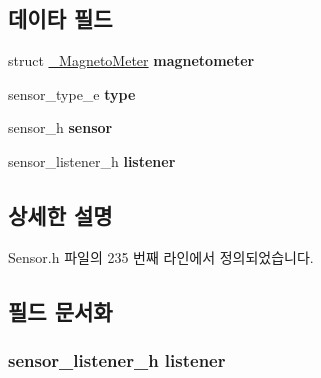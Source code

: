 \subsection*{데이타 필드}
\begin{DoxyCompactItemize}
\item 
\hypertarget{struct___magneto_meter_extend_a8679591114ee0c09969a82b9bd9f9fe4}{struct \hyperlink{struct___magneto_meter}{\-\_\-\-Magneto\-Meter} {\bfseries magnetometer}}\label{struct___magneto_meter_extend_a8679591114ee0c09969a82b9bd9f9fe4}

\item 
\hypertarget{struct___magneto_meter_extend_abffb09766da2fc510a79bb51f82a36e1}{sensor\-\_\-type\-\_\-e {\bfseries type}}\label{struct___magneto_meter_extend_abffb09766da2fc510a79bb51f82a36e1}

\item 
\hypertarget{struct___magneto_meter_extend_a5bae9b7801bc3808411925cde81d3f26}{sensor\-\_\-h {\bfseries sensor}}\label{struct___magneto_meter_extend_a5bae9b7801bc3808411925cde81d3f26}

\item 
\hypertarget{struct___magneto_meter_extend_aa977dfb866b24fd7d9a20a9a01b2fd1f}{sensor\-\_\-listener\-\_\-h {\bfseries listener}}\label{struct___magneto_meter_extend_aa977dfb866b24fd7d9a20a9a01b2fd1f}

\end{DoxyCompactItemize}


\subsection{상세한 설명}


Sensor.\-h 파일의 235 번째 라인에서 정의되었습니다.



\subsection{필드 문서화}
\hypertarget{struct___magneto_meter_extend_aa977dfb866b24fd7d9a20a9a01b2fd1f}{
\subsubsection[{listener}]{\setlength{\rightskip}{0pt plus 5cm}sensor\-\_\-listener\-\_\-h listener}}\label{struct___magneto_meter_extend_aa977dfb866b24fd7d9a20a9a01b2fd1f}


